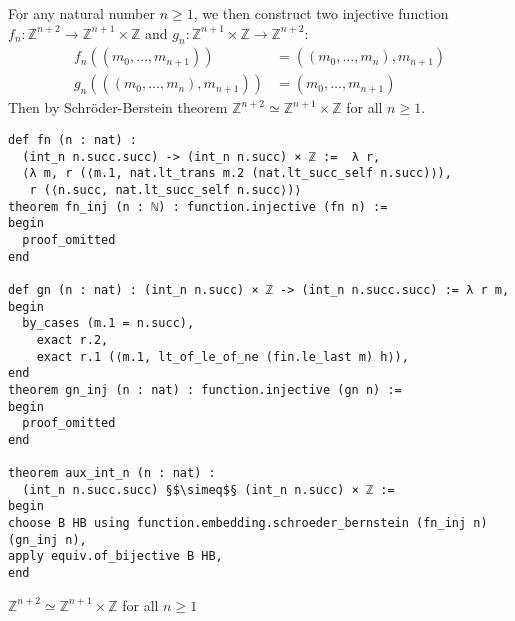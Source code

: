 \documentclass{report}
\theoremstyle{definition}
\theoremstyle{plain}
\newenvironment{code}{\captionsetup{type=listing}}{}
\begin{document}
For any natural number $n\ge 1$, we then construct two injective function $f_n : \mathbb{Z}^{n+2}\to\mathbb{Z}^{n+1}\times\mathbb{Z}$ and $g_n:\mathbb{Z}^{n+1}\times\mathbb{Z}\to\mathbb{Z}^{n+2}$:
\begin{equation*}
\begin{aligned}
f_n((m_0,\dots,m_{n+1}))&=((m_0,\dots,m_{n}),m_{n+1})\\
g_n(((m_0,\dots,m_{n}), m_{n+1}))&=(m_0,\dots,m_{n+1})
\end{aligned}
\end{equation*}
Then by Schr\"oder-Berstein theorem $\mathbb{Z}^{n+2}\simeq\mathbb{Z}^{n+1}\times\mathbb{Z}$ for all $n\ge 1$.
\begin{code}
\begin{verbatim}
def fn (n : nat) : 
  (int_n n.succ.succ) -> (int_n n.succ) × ℤ :=  λ r,
  ⟨λ m, r (⟨m.1, nat.lt_trans m.2 (nat.lt_succ_self n.succ)⟩), 
   r (⟨n.succ, nat.lt_succ_self n.succ⟩)⟩
theorem fn_inj (n : ℕ) : function.injective (fn n) :=
begin
  proof_omitted
end

def gn (n : nat) : (int_n n.succ) × ℤ -> (int_n n.succ.succ) := λ r m,
begin
  by_cases (m.1 = n.succ),
    exact r.2,
    exact r.1 (⟨m.1, lt_of_le_of_ne (fin.le_last m) h⟩),
end
theorem gn_inj (n : nat) : function.injective (gn n) :=
begin
  proof_omitted
end
  
theorem aux_int_n (n : nat) :
  (int_n n.succ.succ) §$\simeq$§ (int_n n.succ) × ℤ :=
begin
choose B HB using function.embedding.schroeder_bernstein (fn_inj n) (gn_inj n),
apply equiv.of_bijective B HB,
end
\end{verbatim}
\caption{$\mathbb{Z}^{n+2}\simeq\mathbb{Z}^{n+1}\times\mathbb{Z}$ for all $n\ge 1$}
\end{code}
\end{document}
